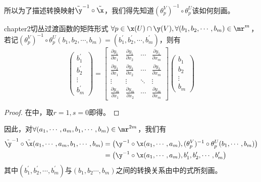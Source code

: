 所以为了描述转换映射$\tilde{  \y }^{-1}\circ\tilde{  \x }$，我们得先知道$(\theta^{V}_{p} )^{-1}\circ \theta^{U}_{p}$该如何刻画。

\begin{mylem}{}{chapter2切丛过渡函数的矩阵形式}
	$\forall p\in\x(U)\cap\y(V),\forall(b_{1},b_{2},\cdots,b_{m})\in \mr^{m}$，若记$(\theta^{V}_{p})^{-1}\circ\theta^{U}_{p}(b_{1},b_{2},\cdots,b_{m})=(b^{\prime}_{1},b^{\prime}_{2},\cdots,b^{\prime}_{m})$，则有
	\begin{equation}
	\left( \begin{array}{cccc}{b^{\prime}_{1}} \\ {b^{\prime}_{2}}  \\ {\vdots} \\ {b^{\prime}_{m}}\end{array}\right)=\left[\begin{array}{ccccc}
		\frac { \partial y _ { 1 } } { \partial x _ { 1 } }& \frac { \partial y _ { 1 } } { \partial x _ { 2 } }& \cdots &\frac { \partial y _ { 1 } } { \partial x _ { m } }\\
		\frac { \partial y _ { 2 } } { \partial x _ { 1 } }& \frac { \partial y _ { 2 } } { \partial x _ { 2 } }& \cdots &\frac { \partial y _ { 2 } } { \partial x _ { m } }\\
		\vdots & \vdots &\ddots & \vdots\\
		\frac { \partial y _ { m } } { \partial x _ { 1 } }& \frac { \partial y _ { m } } { \partial x _ { 2 } }& \cdots &\frac { \partial y _ { m} } { \partial x _ { m } }
		\end{array}\right] \left( \begin{array}{cccc}{b_{1}} \\ {b_{2}}  \\ {\vdots} \\ {b_{m}}\end{array}\right)
			\label{转化式}
	\end{equation}
\end{mylem}
\begin{proof}
在中，取$r=1,s=0$即得。
\end{proof}

因此，对$\forall (a_{1},\cdots,a_{m},b_{1},\cdots,b_{m})\in \mr^{2m}$，我们有
\[
\begin{split}
	\tilde{\y }^{-1}\circ\tilde{\x }( a_{1},\cdots,a_{m},b_{1},\cdots,b_{m})&= \bigl(\y^{-1}\circ\x (a_{1},\cdots,a_{m}),(\theta^{V}_{p} )^{-1}\circ \theta^{U}_{p}(b_{1},\cdots,b_{m}) \bigr)\\
	&=\bigl(\y^{-1}\circ\x (a_{1},\cdots,a_{m}),b^{\prime}_{1},b^{\prime}_{2},\cdots,b^{\prime}_{m} \bigr)
\end{split}
\]
其中$(b^{\prime}_{1},b^{\prime}_{2},\cdots,b^{\prime}_{m})$与$(b_{1},b_{2}\cdots,b_{m})$之间的转换关系由中的式所刻画。

